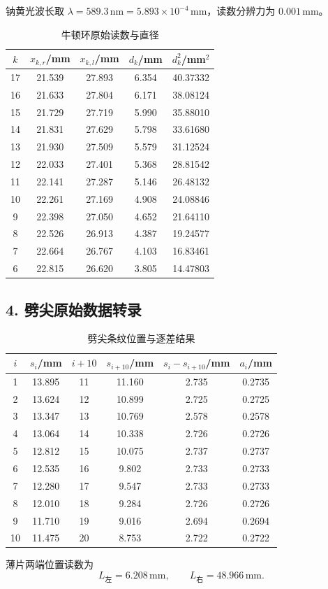 钠黄光波长取 $\lambda=589.3\,\mathrm{nm}=5.893\times10^{-4}\,\mathrm{mm}$，读数分辨力为 $0.001\,\mathrm{mm}$。

\begin{table}[H]
  \centering
  \footnotesize
  \renewcommand{\arraystretch}{1.08}
  \caption{牛顿环原始读数与直径}
  \begin{tabular}{ccccc}
    \toprule
    $k$ & $x_{k,r}$/mm & $x_{k,l}$/mm & $d_k$/mm & $d_k^2$/mm$^2$ \\
    \midrule
    17 & 21.539 & 27.893 & 6.354 & 40.37332 \\
    16 & 21.633 & 27.804 & 6.171 & 38.08124 \\
    15 & 21.729 & 27.719 & 5.990 & 35.88010 \\
    14 & 21.831 & 27.629 & 5.798 & 33.61680 \\
    13 & 21.930 & 27.509 & 5.579 & 31.12524 \\
    12 & 22.033 & 27.401 & 5.368 & 28.81542 \\
    11 & 22.141 & 27.287 & 5.146 & 26.48132 \\
    10 & 22.261 & 27.169 & 4.908 & 24.08846 \\
     9 & 22.398 & 27.050 & 4.652 & 21.64110 \\
     8 & 22.526 & 26.913 & 4.387 & 19.24577 \\
     7 & 22.664 & 26.767 & 4.103 & 16.83461 \\
     6 & 22.815 & 26.620 & 3.805 & 14.47803 \\
    \bottomrule
  \end{tabular}
\end{table}

\subsection*{4. 劈尖原始数据转录}

\begin{table}[H]
  \centering
  \footnotesize
  \renewcommand{\arraystretch}{1.08}
  \caption{劈尖条纹位置与逐差结果}
  \begin{tabular}{cccccc}
    \toprule
    $i$ & $s_i$/mm & $i+10$ & $s_{i+10}$/mm & $s_i-s_{i+10}$/mm & $a_i$/mm \\
    \midrule
     1 & 13.895 & 11 & 11.160 & 2.735 & 0.2735 \\
     2 & 13.624 & 12 & 10.899 & 2.725 & 0.2725 \\
     3 & 13.347 & 13 & 10.769 & 2.578 & 0.2578 \\
     4 & 13.064 & 14 & 10.338 & 2.726 & 0.2726 \\
     5 & 12.812 & 15 & 10.075 & 2.737 & 0.2737 \\
     6 & 12.535 & 16 &  9.802 & 2.733 & 0.2733 \\
     7 & 12.280 & 17 &  9.547 & 2.733 & 0.2733 \\
     8 & 12.010 & 18 &  9.284 & 2.726 & 0.2726 \\
     9 & 11.710 & 19 &  9.016 & 2.694 & 0.2694 \\
    10 & 11.475 & 20 &  8.753 & 2.722 & 0.2722 \\
    \bottomrule
  \end{tabular}
\end{table}

薄片两端位置读数为
\begin{equation}
  L_{\text{左}}=6.208\,\mathrm{mm},\qquad
  L_{\text{右}}=48.966\,\mathrm{mm}.
\end{equation}
